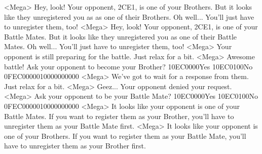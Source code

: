 <Mega> Hey, look! 
Your opponent, {2C}{E1}, is one of your Brothers. 
But it looks like they unregistered you as as one of their Brothers. 
Oh well... You'll just have to unregister them, too! 
<Mega> Hey, look! 
Your opponent, {2C}{E1}, is one of your Battle Mates. 
But it looks like they unregistered you as one of their Battle Mates. 
Oh well... You'll just have to unregister them, too! 
<Mega> Your opponent is still preparing for the battle. Just relax for a bit.
<Mega> Awesome battle! Ask your opponent to become your Brother? {10}{EC}{00}{00}Yes {10}{EC}{01}{00}No {0F}{EC}{00}{00}{01}{00}{00}{00}{00}{00}
<Mega> We've got to wait for a response from them. Just relax for a bit.
<Mega> Geez... Your opponent denied your request. 
<Mega> Ask your opponent to be your Battle Mate? {10}{EC}{00}{00}Yes {10}{EC}{01}{00}No {0F}{EC}{00}{00}{01}{00}{00}{00}{00}{00}
<Mega> It looks like your opponent is one of your Battle Mates. 
If you want to register them as your Brother, you'll 
have to unregister them as your Battle Mate first. 
<Mega> It looks like your opponent is one of your Brothers. 
If you want to register them as your Battle Mate, 
you'll have to unregister them as your Brother first. 
